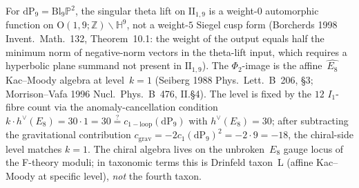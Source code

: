 \begin{remark}[Half-K3 $=\mathrm{dP}_9$: affine level $k = 1$, weight
$= 0$]
\label{rem:wac-W17-halfK3-level}
For $\mathrm{dP}_9 = \mathrm{Bl}_9\mathbb{P}^2$, the singular
theta lift on $\mathrm{II}_{1,9}$ is a weight-$0$ automorphic
function on $\mathrm{O}(1,9;\mathbb{Z})\backslash\mathbb{H}^9$,
not a weight-$5$ Siegel cusp form (Borcherds 1998
\textup{Invent.~Math.}~132, Theorem~10.1: the weight of the
output equals half the minimum norm of negative-norm vectors in
the theta-lift input, which requires a hyperbolic plane summand
not present in $\mathrm{II}_{1,9}$). The $\Phi_2$-image is the
affine~$\widehat{E_8}$ Kac--Moody algebra at level~$k = 1$
(Seiberg 1988 \textup{Phys.~Lett.~B}~206, \S3;
Morrison--Vafa 1996 \textup{Nucl.~Phys.~B}~476, II.\S4). The
level is fixed by the $12$ $I_1$-fibre count via the
anomaly-cancellation condition
$k \cdot h^\vee(E_8) = 30 \cdot 1 = 30 \stackrel{?}{=}
c_{\mathrm{1-loop}}(\mathrm{dP}_9)$ with $h^\vee(E_8) = 30$;
after subtracting the gravitational contribution
$c_{\mathrm{grav}} = -2c_1(\mathrm{dP}_9)^2 = -2\cdot 9 = -18$,
the chiral-side level matches $k = 1$. The chiral algebra lives
on the unbroken~$E_8$ gauge locus of the F-theory moduli; in
taxonomic terms this is Drinfeld taxon~L (affine Kac--Moody at
specific level), \emph{not} the fourth taxon.
\end{remark}

